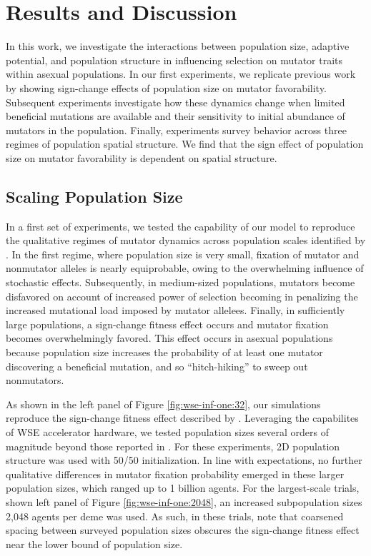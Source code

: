 \section{Results and Discussion} \label{sec:results}

In this work, we investigate the interactions between population size, adaptive potential, and population structure in influencing selection on mutator traits within asexual populations.
In our first experiments, we replicate previous work by \citet{raynes2018sign} showing sign-change effects of population size on mutator favorability.
Subsequent experiments investigate how these dynamics change when limited beneficial mutations are available and their sensitivity to initial abundance of mutators in the population.
Finally, experiments survey behavior across three regimes of population spatial structure.
We find that the sign effect of population size on mutator favorability is dependent on spatial structure.

\subsection{Scaling Population Size}
\label{sec:scaling-population-size}

In a first set of experiments, we tested the capability of our model to reproduce the qualitative regimes of mutator dynamics across population scales identified by \citet{raynes2018sign}.
In the first regime, where population size is very small, fixation of mutator and nonmutator alleles is nearly equiprobable, owing to the overwhelming influence of stochastic effects.
Subsequently, in medium-sized populations, mutators become disfavored on account of increased power of selection becoming in penalizing the increased mutational load imposed by mutator allelees.
Finally, in sufficiently large populations, a sign-change fitness effect occurs and mutator fixation becomes overwhelmingly favored.
This effect occurs in asexual populations because population size increases the probability of at least one mutator discovering a beneficial mutation, and so ``hitch-hiking'' to sweep out nonmutators.



As shown in the left panel of Figure \ref{fig:wse-inf-one:32}, our simulations reproduce the sign-change fitness effect described by \citet{raynes2018sign}.
Leveraging the capabilites of WSE accelerator hardware, we tested population sizes several orders of magnitude beyond those reported in \citet{raynes2018sign}.
For these experiments, 2D population structure was used with 50/50 initialization.
In line with expectations, no further qualitative differences in mutator fixation probability emerged in these larger population sizes, which ranged up to 1 billion agents.
For the largest-scale trials, shown left panel of Figure \ref{fig:wse-inf-one:2048}, an increased subpopulation sizes 2,048 agents per deme was used.
As such, in these trials, note that coarsened spacing between surveyed population sizes obscures the sign-change fitness effect near the lower bound of population size.

